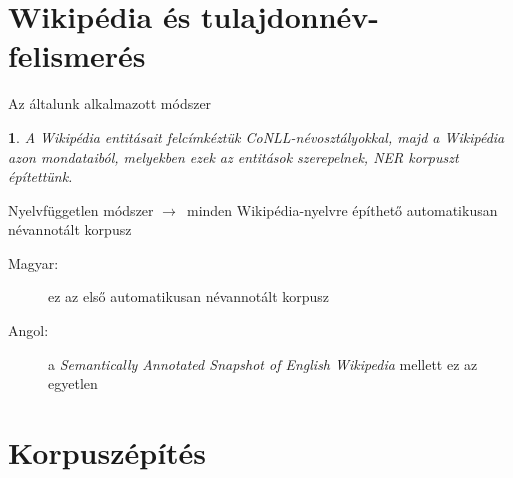 \documentclass[utf8x,t]{beamer}
\newcommand{\nyil}{$\rightarrow$\ }
\newtheorem{nix}{}[section]
\begin{document}
\section{Wikipédia és tulajdonnév-felismerés}

%
%
%
%
%

\begin{frame}{Az általunk alkalmazott módszer}
\bigskip
\begin{nix}
A Wikipédia entitásait felcímkéztük CoNLL-névosztályokkal, majd a Wikipédia azon mondataiból,
melyekben ezek az entitások szerepelnek, NER korpuszt építettünk.
\end{nix}

\bigskip

Nyelvfüggetlen módszer \nyil minden Wikipédia-nyelvre építhető automatikusan névannotált korpusz

\bigskip

\begin{description}
\item[Magyar:] ez az első automatikusan névannotált korpusz
\item[Angol:] a \textit{Semantically Annotated Snapshot of English Wikipedia} mellett ez az egyetlen
\end{description}

\end{frame}

\section{Korpuszépítés}
\end{document}
